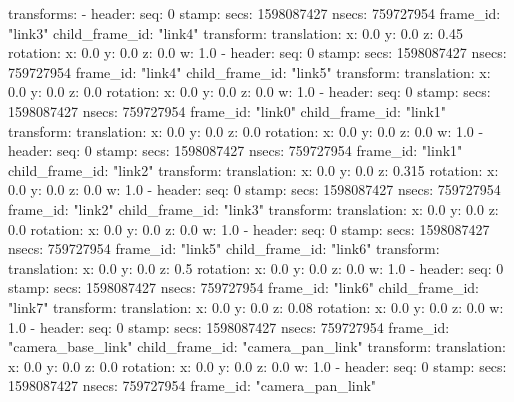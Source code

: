 transforms: 
  - 
    header: 
      seq: 0
      stamp: 
        secs: 1598087427
        nsecs: 759727954
      frame_id: "link3"
    child_frame_id: "link4"
    transform: 
      translation: 
        x: 0.0
        y: 0.0
        z: 0.45
      rotation: 
        x: 0.0
        y: 0.0
        z: 0.0
        w: 1.0
  - 
    header: 
      seq: 0
      stamp: 
        secs: 1598087427
        nsecs: 759727954
      frame_id: "link4"
    child_frame_id: "link5"
    transform: 
      translation: 
        x: 0.0
        y: 0.0
        z: 0.0
      rotation: 
        x: 0.0
        y: 0.0
        z: 0.0
        w: 1.0
  - 
    header: 
      seq: 0
      stamp: 
        secs: 1598087427
        nsecs: 759727954
      frame_id: "link0"
    child_frame_id: "link1"
    transform: 
      translation: 
        x: 0.0
        y: 0.0
        z: 0.0
      rotation: 
        x: 0.0
        y: 0.0
        z: 0.0
        w: 1.0
  - 
    header: 
      seq: 0
      stamp: 
        secs: 1598087427
        nsecs: 759727954
      frame_id: "link1"
    child_frame_id: "link2"
    transform: 
      translation: 
        x: 0.0
        y: 0.0
        z: 0.315
      rotation: 
        x: 0.0
        y: 0.0
        z: 0.0
        w: 1.0
  - 
    header: 
      seq: 0
      stamp: 
        secs: 1598087427
        nsecs: 759727954
      frame_id: "link2"
    child_frame_id: "link3"
    transform: 
      translation: 
        x: 0.0
        y: 0.0
        z: 0.0
      rotation: 
        x: 0.0
        y: 0.0
        z: 0.0
        w: 1.0
  - 
    header: 
      seq: 0
      stamp: 
        secs: 1598087427
        nsecs: 759727954
      frame_id: "link5"
    child_frame_id: "link6"
    transform: 
      translation: 
        x: 0.0
        y: 0.0
        z: 0.5
      rotation: 
        x: 0.0
        y: 0.0
        z: 0.0
        w: 1.0
  - 
    header: 
      seq: 0
      stamp: 
        secs: 1598087427
        nsecs: 759727954
      frame_id: "link6"
    child_frame_id: "link7"
    transform: 
      translation: 
        x: 0.0
        y: 0.0
        z: 0.08
      rotation: 
        x: 0.0
        y: 0.0
        z: 0.0
        w: 1.0
  - 
    header: 
      seq: 0
      stamp: 
        secs: 1598087427
        nsecs: 759727954
      frame_id: "camera_base_link"
    child_frame_id: "camera_pan_link"
    transform: 
      translation: 
        x: 0.0
        y: 0.0
        z: 0.0
      rotation: 
        x: 0.0
        y: 0.0
        z: 0.0
        w: 1.0
  - 
    header: 
      seq: 0
      stamp: 
        secs: 1598087427
        nsecs: 759727954
      frame_id: "camera_pan_link"
